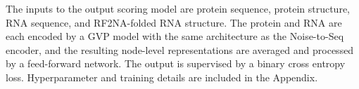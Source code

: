 The inputs to the output scoring model are protein sequence, protein structure, RNA sequence, and RF2NA-folded RNA structure. The protein and RNA are each encoded by a GVP model with the same architecture as the Noise-to-Seq encoder, and the resulting node-level representations are averaged and processed by a feed-forward network. The output is supervised by a binary cross entropy loss. Hyperparameter and training details are included in the Appendix.